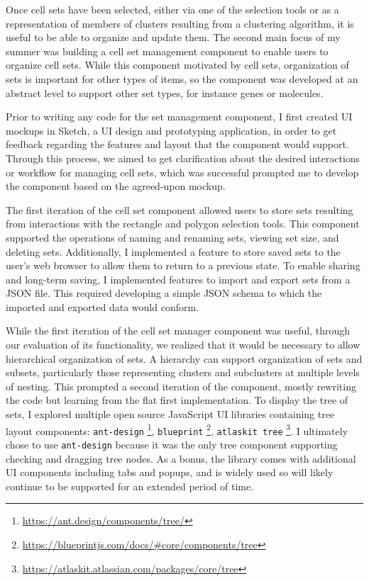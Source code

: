 \documentclass[12pt, letterpaper]{article}
\begin{document}
Once cell sets have been selected, either via one of the selection tools or as a representation of members of clusters resulting from a clustering algorithm, it is useful to be able to organize and update them.
The second main focus of my summer was building a cell set management component to enable users to organize cell sets.
While this component motivated by cell sets, organization of sets is important for other types of items, so the component was developed at an abstract level to support other set types, for instance genes or molecules.

Prior to writing any code for the set management component, I first created UI mockups in Sketch, a UI design and prototyping application, in order to get feedback regarding the features and layout that the component would support.
Through this process, we aimed to get clarification about the desired interactions or workflow for managing cell sets, which was successful prompted me to develop the component based on the agreed-upon mockup.

The first iteration of the cell set component allowed users to store sets resulting from interactions with the rectangle and polygon selection tools.
This component supported the operations of naming and renaming sets, viewing set size, and deleting sets.
Additionally, I implemented a feature to store saved sets to the user's web browser to allow them to return to a previous state.
To enable sharing and long-term saving, I implemented features to import and export sets from a JSON file.
This required developing a simple JSON schema to which the imported and exported data would conform.

While the first iteration of the cell set manager component was useful, through our evaluation of its functionality, we realized that it would be necessary to allow hierarchical organization of sets.
A hierarchy can support organization of sets and subsets, particularly those representing clusters and subclusters at multiple levels of nesting.
This prompted a second iteration of the component, mostly rewriting the code but learning from the flat first implementation.
To display the tree of sets, I explored multiple open source JavaScript UI libraries containing tree layout components: \texttt{ant-design} \footnote{\url{https://ant.design/components/tree/}}, \texttt{blueprint} \footnote{\url{https://blueprintjs.com/docs/\#core/components/tree}}, \texttt{atlaskit tree} \footnote{\url{https://atlaskit.atlassian.com/packages/core/tree}}.
I ultimately chose to use \texttt{ant-design} because it was the only tree component supporting checking and dragging tree nodes.
As a bonus, the library comes with additional UI components including tabs and popups, and is widely used so will likely continue to be supported for an extended period of time.
\end{document}

